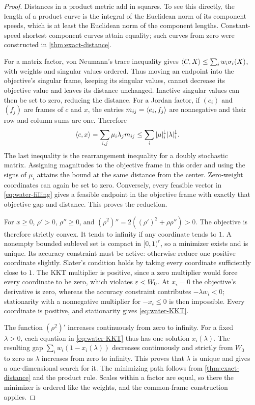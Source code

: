\begin{proof}
Distances in a product metric add in squares. To see this directly, the
length of a product curve is the integral of the Euclidean norm of its
component speeds, which is at least the Euclidean norm of the component
lengths. Constant-speed shortest component curves attain equality; such
curves from zero were constructed in \cref{thm:exact-distance}.

For a matrix factor, von Neumann's trace inequality gives
$\langle C,X\rangle\leq\sum_iw_i\sigma_i(X)$, with weights and singular values
ordered. Thus moving an endpoint into the objective's singular frame,
keeping its singular values, cannot decrease its objective value and
leaves its distance unchanged.
Inactive singular values can then be set to zero, reducing the distance.
For a Jordan factor, if $(e_i)$ and $(f_j)$ are frames of $c$ and $x$,
the entries $m_{ij}=\langle e_i,f_j\rangle$ are nonnegative and their row and
column sums are one. Therefore
\[
 \langle c,x\rangle=\sum_{i,j}\mu_i\lambda_j m_{ij}
 \leq\sum_i|\mu|_i^\downarrow|\lambda|_i^\downarrow.
\]
The last inequality is the rearrangement inequality for a doubly
stochastic matrix. Assigning magnitudes to the objective frame in this
order and using the signs of $\mu_i$ attains the bound at the same
distance from the center. Zero-weight coordinates can again be set to
zero. Conversely, every feasible vector in \eqref{eq:water-filling}
gives a feasible endpoint in the objective frame with exactly that
objective gap and distance. This proves the reduction.

For $x\geq0$, $\rho'>0$, $\rho''\geq0$, and
$(\rho^2)''=2((\rho')^2+\rho\rho'')>0$.
The objective is therefore strictly convex. It tends to infinity if
any coordinate tends to $1$. A nonempty bounded sublevel set is compact
in $[0,1)^r$, so a minimizer exists and is unique.
Its accuracy constraint must be active: otherwise reduce one positive
coordinate slightly. Slater's condition holds by taking every
coordinate sufficiently close to $1$. The KKT multiplier is positive,
since a zero multiplier would force every coordinate to be zero, which
violates $\varepsilon<W_0$. At $x_i=0$ the objective's derivative is zero,
whereas the accuracy constraint contributes $-\lambda w_i<0$;
stationarity with a nonnegative multiplier for $-x_i\leq0$ is then
impossible. Every coordinate is positive, and stationarity gives
\eqref{eq:water-KKT}.

The function $(\rho^2)'$ increases continuously from zero to infinity.
For a fixed $\lambda>0$, each equation in \eqref{eq:water-KKT} thus has
one solution $x_i(\lambda)$. The resulting gap
$\sum_iw_i(1-x_i(\lambda))$ decreases continuously and strictly from
$W_0$ to zero as $\lambda$ increases from zero to infinity.
This proves that $\lambda$ is unique and gives a one-dimensional search
for it. The minimizing path follows from \cref{thm:exact-distance} and
the product rule. Scales within a factor are equal, so there the
minimizer is ordered like the weights, and the common-frame
construction applies.
\end{proof}

